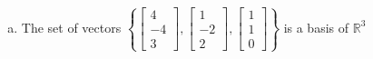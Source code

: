 \begin{exerciseAnswer}
\begin{enumerate}[(a)]
\item The set of vectors \( \left\{ \left[\begin{array}{c}
4 \\
-4 \\
3
\end{array}\right] , \left[\begin{array}{c}
1 \\
-2 \\
2
\end{array}\right] , \left[\begin{array}{c}
1 \\
1 \\
0
\end{array}\right] \right\} \) is a basis of \(\mathbb{R}^3\)
\end{enumerate}
    
\end{exerciseAnswer}
    
